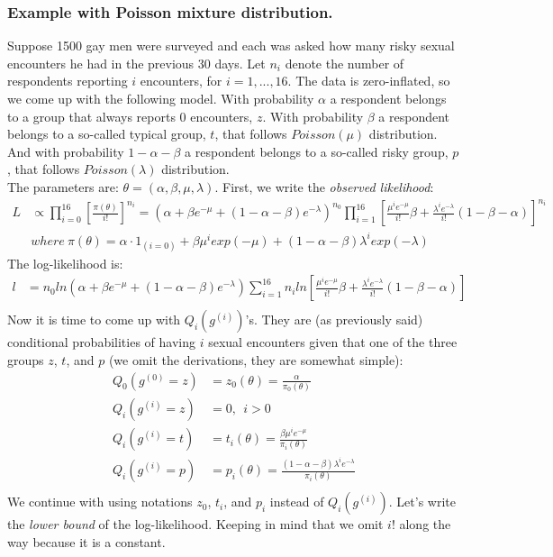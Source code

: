 \documentclass[]{article}
\begin{document}
\subsubsection{Example with Poisson mixture distribution.}
Suppose 1500 gay men were surveyed and each was asked how many risky sexual encounters he had in the previous 30 days. Let $n_i$ denote the number of respondents reporting $i$ encounters, for $i=1,...,16$. The data is zero-inflated, so we come up with the following model. With probability $\alpha$ a respondent belongs to a group that always reports $0$ encounters, $z$. With probability $\beta$ a respondent belongs to a so-called typical group, $t$, that follows $Poisson(\mu)$ distribution. And with probability $1 - \alpha - \beta$ a respondent belongs to a so-called risky group, $p$, that follows $Poisson(\lambda)$ distribution.\\
The parameters are: $\theta = (\alpha, \beta, \mu, \lambda)$. First, we write the \emph{observed likelihood}:
$$
\begin{aligned}
	L &\propto \prod_{i=0}^{16}\left[\frac{ \pi(\theta)}{i!} \right]^{n_i} = \left(   \alpha + \beta  e^{-\mu} + (1-\alpha - \beta) e^{-\lambda}  \right)^{n_0} \prod _{i=1}^{16} \left[\frac{ \mu^ie^{-\mu} }{i!} \beta   +   \frac{ \lambda^i e^{-\lambda} }{i!} (1-\beta-\alpha) \right]^{n_i}\\
	  &where~\pi(\theta) = \alpha\cdot 1_{(i=0)} + \beta \mu^i exp(-\mu) + (1-\alpha - \beta) \lambda^i exp(-\lambda)
\end{aligned}
$$
The log-likelihood is:
$$
\begin{aligned}
	l &= n_0 ln\left(   \alpha + \beta  e^{-\mu} + (1-\alpha - \beta) e^{-\lambda}  \right)   \sum _{i=1}^{16} n_i ln \left[\frac{ \mu^ie^{-\mu} }{i!} \beta   +   \frac{ \lambda^i e^{-\lambda} }{i!} (1-\beta-\alpha) \right]\\
\end{aligned}
$$
Now it is time to come up with $Q_i(g^{(i)})$'s. They are (as previously said) conditional probabilities of having $i$ sexual encounters given that one of the three groups $z$, $t$, and $p$ (we omit the derivations, they are somewhat simple):
$$
\begin{aligned}
	Q_0(g^{(0)} = z) &= z_0(\theta) = \frac{\alpha}{\pi_0(\theta)}\\ 
	Q_i(g^{(i)} = z) &= 0,~~i>0\\ 
	Q_i(g^{(i)} = t) &= t_i(\theta) = \frac{\beta \mu^i e^{-\mu}}{\pi_i(\theta)}\\ 
	Q_i(g^{(i)} = p) &= p_i(\theta) = \frac{(1 - \alpha - \beta) \lambda^i e^{-\lambda}}{\pi_i(\theta)}\\ 
 \end{aligned}
$$
We continue with using notations $z_0$, $t_i$, and $p_i$ instead of $Q_i(g^{(i)})$. Let's write the \emph{lower bound} of the log-likelihood. Keeping in mind that we omit $i!$ along the way because it is a constant.
\end{document}
